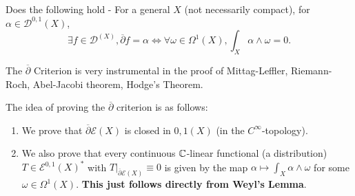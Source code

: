 \documentclass{article}
\begin{document}
{\begin{question}
    Does the following hold -  For a general $X$ (not necessarily compact), for $\alpha \in \mathcal{D}^{0, 1}(X)$,
    \[\exists f \in \mathcal{D}^(X), \overline{\partial} f = \alpha \iff \forall \omega \in \Omega^1(X), \int_X \alpha \wedge \omega = 0. \]
\end{question}

\begin{remark}
    The $\overline{\partial}$ Criterion is very instrumental in the proof of Mittag-Leffler, Riemann-Roch, Abel-Jacobi theorem, Hodge's Theorem.
\end{remark}

The idea of proving the $\overline{\partial}$ criterion is as follows:
\begin{enumerate}
    \item We prove that $\overline{\partial} \mathcal{E}(X)$ is closed in $\mathcal{0, 1}(X)$ (in the $C^\infty$-topology).
    \item We also prove that every continuous $\mathbb{C}$-linear functional (a distribution) $T \in \mathcal{E}^{0, 1}(X)^*$ with $T|_{\overline{\partial} \mathcal{E}(X)} \equiv 0$ is given by the map $\alpha \mapsto \int_X \alpha \wedge \omega$ for some $\omega \in \Omega^1(X)$. \textbf{This just follows directly from Weyl's Lemma}.
\end{enumerate}

}
\end{document}
